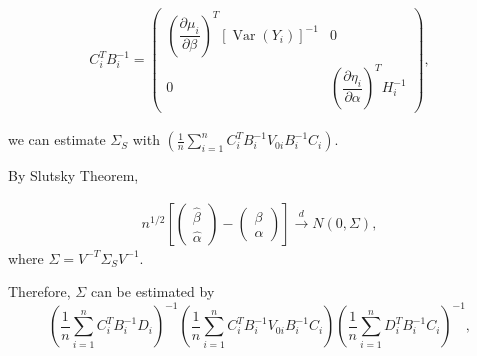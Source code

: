 \documentclass[UTF8,a4paper,10pt]{article}
\begin{document}
\begin{equation*}
  \begin{aligned}
    C_{i}^{T} B_{i}^{-1} = \begin{pmatrix}
      \left(\dfrac{\partial \mu_{i}}{\partial \beta}\right)^{T}[\operatorname{Var}(Y_i)]^{-1}
      & 0\\ 
      0
      & \left(\dfrac{\partial \eta_{i}}{\partial \alpha}\right)^{T} H_{i}^{-1}
    \end{pmatrix},
  \end{aligned}
\end{equation*}

we can estimate \(\Sigma_S\) with \(\left(\frac{1}{n} \sum_{i=1}^{n} C_{i}^{T} B_{i}^{-1} V_{0 i} B_{i}^{-1} C_{i}\right)\).

By Slutsky Theorem,

\begin{equation*}
  \begin{aligned}
    n^{1/2}\left[\left(\begin{array}{l}\hat{\beta} \\ \hat{\alpha}\end{array}\right)-\left(\begin{array}{c}\beta \\ \alpha\end{array}\right)\right] \xrightarrow{d} N(0,\Sigma),
  \end{aligned}
\end{equation*}
where \(\Sigma = V^{-T}\Sigma_S V^{-1}\).

Therefore, $\Sigma$ can be estimated by 
\[\left(\frac{1}{n} \sum_{i=1}^{n} C_{i}^{T} B_{i}^{-1} D_{i}\right)^{-1}\left(\frac{1}{n} \sum_{i=1}^{n} C_{i}^{T} B_{i}^{-1} V_{0 i} B_{i}^{-1} C_{i}\right)\left(\frac{1}{n} \sum_{i=1}^{n} D_{i}^{T} B_{i}^{-1} C_{i}\right)^{-1},\]





\end{document}
